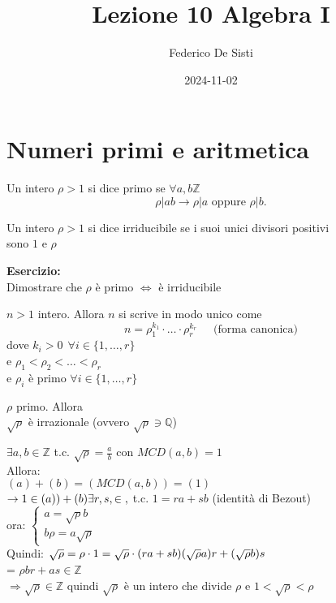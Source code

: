\documentclass[12px]{article}
\title{Lezione 10 Algebra I}
\date{2024-11-02}
\author{Federico De Sisti}
\begin{document}
	\maketitle
	\newpage
	\section{Numeri primi e aritmetica}
	\begin{defi}
		Un intero $\rho > 1$ si dice primo se  $\forall a,b\mathbb Z$
		 \[
			 \rho|ab \rightarrow \rho|a \text{ oppure } \rho|b
		.\] 
	\end{defi}
	\begin{defi}
		Un intero $\rho>1$ si dice irriducibile se i suoi unici divisori positivi\\ sono  $1$ e $\rho$
	\end{defi}
	\textbf{Esercizio:}\\
	Dimostrare che $\rho$ è primo $\Leftrightarrow$ è irriducibile
	\begin{teo}
		$n>1$ intero. Allora $n$ si scrive in modo unico come
		\[
			n = \rho_1^{k_1}\cdot\ldots\cdot \rho_r^{k_r} \ \ \ \ \ \text{ (forma canonica)}
		\] 
		dove $k_i>0 \ \ \forall i\in\{1,\ldots,r\}$\\
		e $\rho_1<\rho_2<\ldots<\rho_r$\\
		e $\rho_i$ è primo  $\forall i\in \{1,\ldots,r\}$
	\end{teo}
	\begin{teo}
		$\rho$ primo. Allora\\
		$\sqrt \rho $ è irrazionale (ovvero $\sqrt\rho\ni \mathbb Q$)
	\end{teo}
	\begin{dimo}
		$\exists a, b\in \mathbb Z$ t.c.  $\sqrt\rho = \frac a b$ con $MCD(a,b) = 1$\\
		Allora:\\
		 $(a) + (b) = (MCD(a,b)) = (1)$\\
		  $\rightarrow 1\in (a)) + (b)\\
		  \exists r,s,\in\mathbb,$ t.c. $1 = ra + sb$ (identità di Bezout)\\
		  ora:  $ \begin{cases}
		  	a = \sqrt \rho b \\ b\rho = a\sqrt\rho
		  \end{cases}$ \\
		  Quindi:
		  $\sqrt \rho = \rho\cdot 1 = \sqrt \rho\cdot (ra + sb)\\
		  (\sqrt\rho a)r + (\sqrt\rho b)s$\\
		  =  $\rho b r + as\in \mathbb Z$\\
		   $ \Rightarrow \sqrt\rho\in\mathbb Z$ quindi $\sqrt\rho$ è un intero che divide $\rho$ e $1<\sqrt\rho<\rho$
	\end{dimo}
\end{document}
